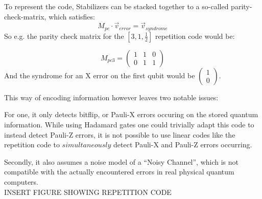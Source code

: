 To represent the code, Stabilizers can be stacked together to
a so-called parity-check-matrix, which satisfies:
\begin{equation}
	M_{pc}\cdot \vec{v}_{error} = \vec{v}_{syndrome}
\end{equation}
So e.g. the parity check matrix for the $[3,1,\frac{1}{2}]$
repetition code would be:

\begin{equation}
	M_{pc3} = \left( 
	\begin{array}{ccc}
		1 & 1 & 0 \\
		0 & 1 & 1
	\end{array}
	\right)
\end{equation}
And the syndrome for an X error on the first qubit would be
$\left(\begin{array}{c}1\\0\end{array}\right)$.

This way of encoding information however leaves two notable
issues:

For one, it only detects bitflip, or Pauli-X errors occuring on
the stored quantum information. While using Hadamard gates one
could trivially adapt this code to instead detect Pauli-Z errors,
it is not possible to use linear codes like the repetition code
to $simultaneously$ detect Pauli-X and Pauli-Z errors occurring.

Secondly, it also assumes a noise model of a ``Noisy Channel'',
which is not compatible with the actually encountered errors in
real physical quantum computers.\\
INSERT FIGURE SHOWING REPETITION CODE